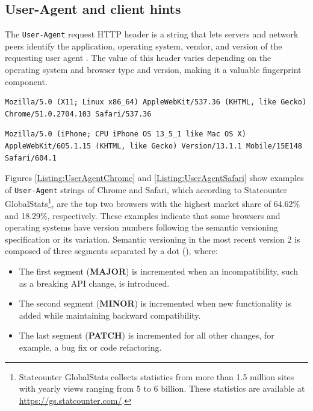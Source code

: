 \subsection{User-Agent and client hints}
\label{SubSection:UserAgentDesign}

The \texttt{User-Agent} request HTTP header is a string that lets servers and network peers identify the application, operating system, vendor, and version of the requesting user agent \cite{MDN}. The value of this header varies depending on the operating system and browser type and version, making it a valuable fingerprint component.

\bigbreak

\begin{lstlisting}[caption={An example of Chrome User-Agent string \cite{MDNHeaderUserAgent}.}, label={Listing:UserAgentChrome}]
Mozilla/5.0 (X11; Linux x86_64) AppleWebKit/537.36 (KHTML, like Gecko) Chrome/51.0.2704.103 Safari/537.36
\end{lstlisting}

\begin{lstlisting}[caption={An example of Safari User-Agent string (mobile version) \cite{MDNHeaderUserAgent}.}, label={Listing:UserAgentSafari}]
Mozilla/5.0 (iPhone; CPU iPhone OS 13_5_1 like Mac OS X) AppleWebKit/605.1.15 (KHTML, like Gecko) Version/13.1.1 Mobile/15E148 Safari/604.1
\end{lstlisting}

\medbreak

Figures \ref{Listing:UserAgentChrome} and \ref{Listing:UserAgentSafari} show examples of \texttt{User-Agent} strings of Chrome and Safari, which according to Statcounter GlobalStats\footnote{Statcounter GlobalStats collects statistics from more than 1.5 million sites with yearly views ranging from 5 to 6 billion. These statistics are available at \url{https://gs.statcounter.com/}.}, are the top two browsers with the highest market share of 64.62\% and 18.29\%, respectively. These examples indicate that some browsers and operating systems have version numbers following the semantic versioning specification\cite{SemVerWebsite} or its variation. Semantic versioning in the most recent version 2 is composed of three segments separated by a dot (), where:

\begin{itemize}
	\item The first segment (\textbf{MAJOR}) is incremented when an incompatibility, such as a breaking API change, is introduced.
	\item The second segment (\textbf{MINOR}) is incremented when new functionality is added while maintaining backward compatibility.
	\item The last segment (\textbf{PATCH}) is incremented for all other changes, for example, a bug fix or code refactoring.
\end{itemize}

